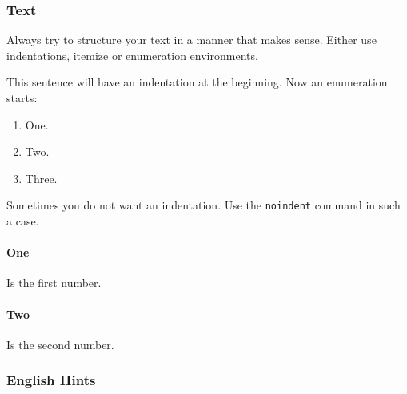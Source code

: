 \subsubsection{Text }
Always try to structure your text in a manner that makes sense. Either use indentations, itemize or enumeration environments.

This sentence will have an indentation at the beginning. Now an enumeration starts:

\begin{enumerate}
\item One.
\item Two.
\item Three.
\end{enumerate}

\noindent Sometimes you do not want an indentation. Use the \texttt{noindent} command in such a case.

\paragraph{One} Is the first number. 

\paragraph{Two} Is the second number.

\subsubsection{English Hints}

